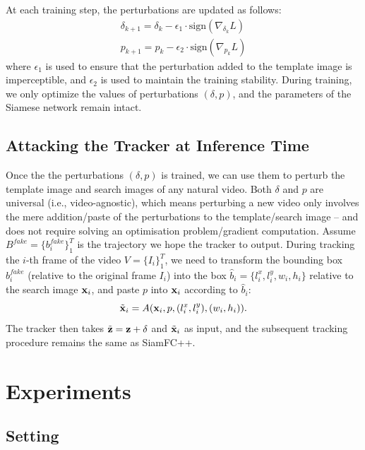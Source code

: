 \documentclass{article}
\begin{document}
At each training step, the perturbations are updated as follows:
\begin{gather}
\delta_{k+1} = \delta_{k} - \epsilon_1 \cdot \text{sign}(\nabla_{\delta_k}L)\\
p_{k+1} = p_{k} - \epsilon_2 \cdot \text{sign}(\nabla_{p_k}L)
\end{gather}
where $\epsilon_1$ is used to ensure that the perturbation added to the template image is imperceptible, and $\epsilon_2$ is used to maintain the training stability.
During training, we only optimize the values of perturbations $(\delta, p)$, and the parameters of the Siamese network remain intact.

\subsection{Attacking the Tracker at Inference Time}

Once the the perturbations $(\delta, p)$ is trained, we can use them to perturb the template image and search images of any natural video. Both $\delta$ and $p$ are universal (i.e., video-agnostic), which means perturbing a new video only involves the mere addition/paste of the perturbations to the template/search image -- and does not require solving an optimisation problem/gradient computation.
Assume $B^{fake}=\{b^{fake}_i\}_1^{T}$ is the trajectory we hope the tracker to output.
During tracking the $i$-th frame of the video $V=\{I_i\}_1^T$, we need to transform the bounding box $b^{fake}_i$ (relative to the original frame $I_i$) into the box $\hat b_i=\{l^x_i, l^y_i, w_i, h_i\}$ relative to the search image $\textbf x_i$, and paste $p$ into $\textbf x_i$ according to $\hat b_i$:
\begin{equation}
\tilde{\textbf x}_i = A(\textbf x_i, p, (l^x_i, l^y_i), (w_i, h_i)).
\end{equation}
The tracker then takes $\tilde{\textbf z}=\textbf z+\delta$ and $\tilde{ \textbf x}_i$ as input, and the subsequent tracking procedure remains the same as SiamFC++.

\section{Experiments}

\subsection{Setting}
\end{document}
